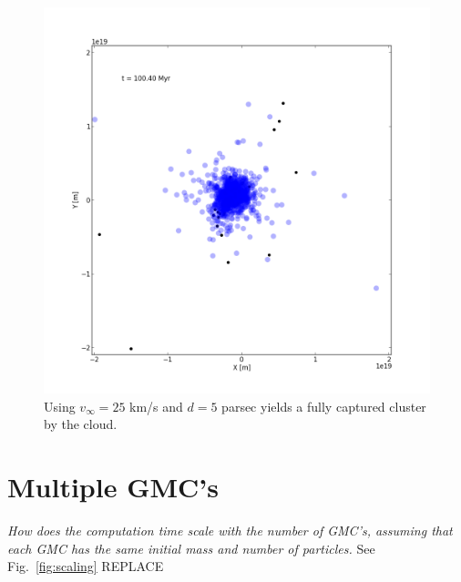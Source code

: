 \documentclass{aa}
\begin{document}
\begin{figure}
    \centering
    \includegraphics[width=\hsize]{img/v_25_d_5.png}
    \caption{Using $v_\infty = 25$ km/s and $d = 5$ parsec yields a fully captured cluster by the cloud.}\label{fig:v_25_d_5}
\end{figure}

\section{Multiple GMC's}

\textit{How does the computation time scale with the number of GMC's, assuming that each GMC has the same initial mass and number of particles.} See Fig.~\ref{fig:scaling} REPLACE
\end{document}

